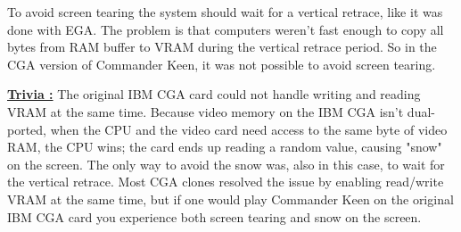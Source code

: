 \documentclass[book.tex]{subfiles}
\begin{document}
\pagebreak
To avoid screen tearing the system should wait for a vertical retrace, like it was done with EGA. The problem is that computers weren't fast enough to copy all bytes from RAM buffer to VRAM during the vertical retrace period. So in the CGA version of Commander Keen, it was not possible to avoid screen tearing.\\

\par
\begin{minipage}{\textwidth}
  
\end{minipage}
\label{cga_screen_refresh}
\par

\pagebreak
\textbf{\underline{Trivia :}} The original IBM CGA card could not handle writing and reading VRAM at the same time. Because video memory on the IBM CGA isn't dual-ported, when the CPU and the video card need access to the same byte of video RAM, the CPU wins; the card ends up reading a random value, causing "snow" on the screen. The only way to avoid the snow was, also in this case, to wait for the vertical retrace. Most CGA clones resolved the issue by enabling read/write VRAM at the same time, but if one would play Commander Keen on the original IBM CGA card you experience both screen tearing and snow on the screen.\\
\par
\end{document}
